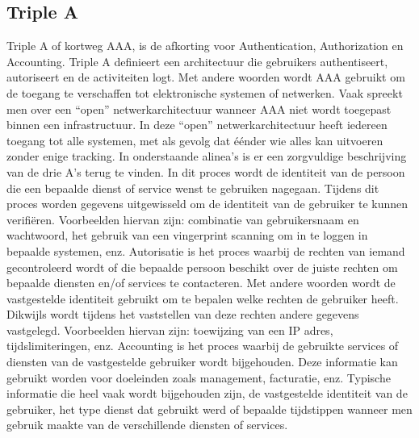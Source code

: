 \subsection{Triple A }
Triple A of kortweg AAA, is de afkorting voor Authentication, Authorization en Accounting. Triple A definieert een architectuur die gebruikers authentiseert, autoriseert en de activiteiten logt. Met andere woorden wordt AAA gebruikt om de toegang te verschaffen tot elektronische systemen of netwerken.
\newline
\newline
Vaak spreekt men over een “open” netwerkarchitectuur wanneer AAA niet wordt toegepast binnen een infrastructuur. In deze “open” netwerkarchitectuur heeft iedereen toegang tot alle systemen, met als gevolg dat éénder wie alles kan uitvoeren zonder enige tracking.
\newline
\newline
In onderstaande alinea’s is er een zorgvuldige beschrijving van de drie A’s terug te vinden.
\newline
In dit proces wordt de identiteit van de persoon die een bepaalde dienst of service wenst te gebruiken nagegaan. Tijdens dit proces worden gegevens uitgewisseld om de identiteit van de gebruiker te kunnen verifiëren. Voorbeelden hiervan zijn: combinatie van gebruikersnaam en wachtwoord, het gebruik van een vingerprint scanning om in te loggen in bepaalde systemen, enz.
\newpage
{}
\newline 
Autorisatie is het proces waarbij de rechten van iemand gecontroleerd wordt of die bepaalde persoon beschikt over de juiste rechten om bepaalde diensten en/of services te contacteren. Met andere woorden wordt de vastgestelde identiteit gebruikt om te bepalen welke rechten de gebruiker heeft. Dikwijls wordt tijdens het vaststellen van deze rechten andere gegevens vastgelegd. Voorbeelden hiervan zijn: toewijzing van een IP adres, tijdslimiteringen, enz.
\newline
Accounting is het proces waarbij de gebruikte services of diensten van de vastgestelde gebruiker wordt bijgehouden. Deze informatie kan gebruikt worden voor doeleinden zoals management, facturatie, enz. Typische informatie die heel vaak wordt bijgehouden zijn, de vastgestelde identiteit van de gebruiker, het type dienst dat gebruikt werd of bepaalde tijdstippen wanneer men gebruik maakte van de verschillende diensten of services. 

